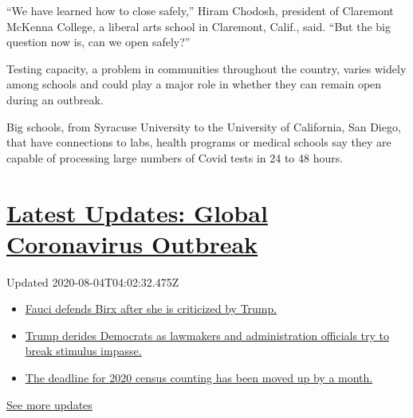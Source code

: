 ``We have learned how to close safely,'' Hiram Chodosh, president of
Claremont McKenna College, a liberal arts school in Claremont, Calif.,
said. ``But the big question now is, can we open safely?''

Testing capacity, a problem in communities throughout the country,
varies widely among schools and could play a major role in whether they
can remain open during an outbreak.

Big schools, from Syracuse University to the University of California,
San Diego, that have connections to labs, health programs or medical
schools say they are capable of processing large numbers of Covid tests
in 24 to 48 hours.

\hypertarget{latest-updates-global-coronavirus-outbreak}{%
\section{\texorpdfstring{\href{https://www.nytimes.com/2020/08/03/world/coronavirus-covid-19.html?action=click\&pgtype=Article\&state=default\&region=MAIN_CONTENT_1\&context=storylines_live_updates}{Latest
Updates: Global Coronavirus
Outbreak}}{Latest Updates: Global Coronavirus Outbreak}}\label{latest-updates-global-coronavirus-outbreak}}

Updated 2020-08-04T04:02:32.475Z

\begin{itemize}
\tightlist
\item
  \href{https://www.nytimes.com/2020/08/03/world/coronavirus-covid-19.html?action=click\&pgtype=Article\&state=default\&region=MAIN_CONTENT_1\&context=storylines_live_updates\#link-4547638f}{Fauci
  defends Birx after she is criticized by Trump.}
\item
  \href{https://www.nytimes.com/2020/08/03/world/coronavirus-covid-19.html?action=click\&pgtype=Article\&state=default\&region=MAIN_CONTENT_1\&context=storylines_live_updates\#link-15e7f995}{Trump
  derides Democrats as lawmakers and administration officials try to
  break stimulus impasse.}
\item
  \href{https://www.nytimes.com/2020/08/03/world/coronavirus-covid-19.html?action=click\&pgtype=Article\&state=default\&region=MAIN_CONTENT_1\&context=storylines_live_updates\#link-e5a2cda}{The
  deadline for 2020 census counting has been moved up by a month.}
\end{itemize}

\href{https://www.nytimes.com/2020/08/03/world/coronavirus-covid-19.html?action=click\&pgtype=Article\&state=default\&region=MAIN_CONTENT_1\&context=storylines_live_updates}{See
more updates}

